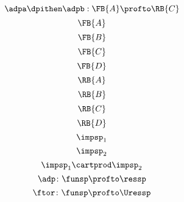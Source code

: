{\begin{forslides}
\begin{equation}
    \end{equation}
    \begin{equation}
        \label{eq:adp1adp2}
        \adpa\dpithen\adpb: \FB{A} \profto  \RB{C}
    \end{equation}
    \begin{equation}
        \label{eq:FA}
        \FB{A}
    \end{equation}
    \begin{equation}
        \label{eq:FB}
        \FB{B}
    \end{equation}
    \begin{equation}
        \label{eq:FC}
        \FB{C}
    \end{equation}
    \begin{equation}
        \label{eq:FD}
        \FB{D}
    \end{equation}
    \begin{equation}
        \label{eq:RA}
        \RB{A}
    \end{equation}
    \begin{equation}
        \label{eq:RB}
        \RB{B}
    \end{equation}
    \begin{equation}
        \label{eq:RC}
        \RB{C}
    \end{equation}
    \begin{equation}
        \label{eq:RD}
        \RB{D}
    \end{equation}
    \begin{equation}
        \label{eq:impsp1}
        \impsp_1
    \end{equation}
    \begin{equation}
        \label{eq:impsp2}
        \impsp_2
    \end{equation}
    \begin{equation}
        \label{eq:impsp12}
        \impsp_{1} \cartprod \impsp_{2}
    \end{equation}
    \begin{equation}
        \label{eq:dproba}
        \adp \colon \funsp \profto \ressp
    \end{equation}
    \begin{equation}
        \label{eq:dprob2}
        \ftor \colon \funsp \profto \Uressp
    \end{equation}
    
\end{forslides}

}